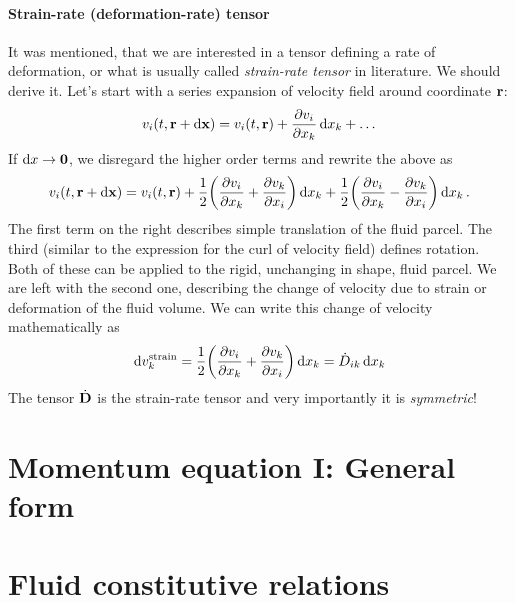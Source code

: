 \documentclass{article}
\begin{document}
\paragraph{Strain-rate (deformation-rate) tensor}
It was mentioned, that we are interested in a tensor defining a rate of 
deformation, or what is usually called \emph{strain-rate tensor} in 
literature. We should derive it. Let's start with a series expansion of 
velocity field around coordinate \(\vb{r}\):
\[
  v_i(t, \vb{r} + \dd{\vb{x}}) = v_i(t, \vb{r}) + \pdv{v_i}{x_k}\dd{x_k}
  + \dots
\]
If \(\dd{x}\rightarrow\vb{0}\), we disregard the higher order terms and 
rewrite the above as 
\[
  v_i(t, \vb{r} + \dd{\vb{x}}) = v_i(t, \vb{r}) 
  + \frac{1}{2}\qty(\pdv{v_i}{x_k} + \pdv{v_k}{x_i})\dd{x_k}
  + \frac{1}{2}\qty(\pdv{v_i}{x_k} - \pdv{v_k}{x_i})\dd{x_k}.
\]
The first term on the right describes simple translation of the fluid parcel.
The third (similar to the expression for the curl of velocity field) defines
rotation. Both of these can be applied to the rigid, unchanging in shape, 
fluid parcel. We are left with the second one, describing the change of 
velocity due to  strain or deformation of the fluid volume. 
We can write this change of velocity mathematically as
\begin{equation}\label{eq::strain_rate_tensor}
  \dd{v^\mathrm{strain}_k} 
  = \frac{1}{2}\qty(\pdv{v_i}{x_k} + \pdv{v_k}{x_i})\dd{x_k}
  = \dot{D}_{ik}\dd{x_k}
\end{equation}
The tensor \(\dot{\vb{D}}\) is the strain-rate tensor and very importantly 
it is \emph{symmetric}!

\section{Momentum equation I: General form}

\section{Fluid constitutive relations}
\end{document}
